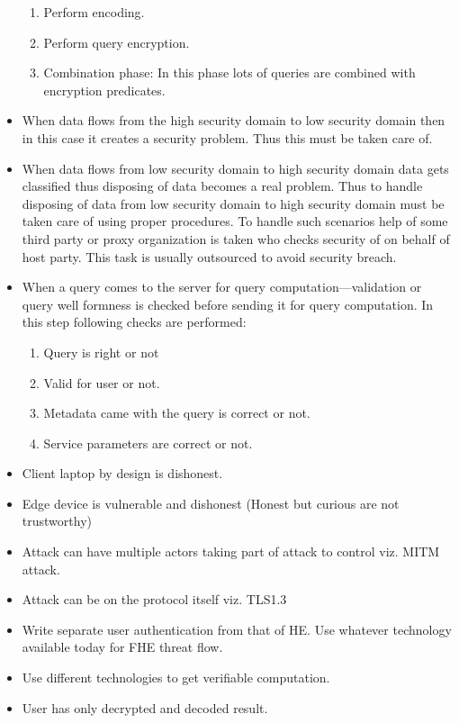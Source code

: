 \begin{itemize}
\begin{enumerate}
              \item Perform encoding.
              \item Perform query encryption.
              \item Combination phase: In this phase lots of queries are combined with encryption predicates.
          \end{enumerate}
    \item When data flows from the high security domain to low security domain then in this case it creates a security problem. Thus this must be taken care of.
    \item When data flows from low security domain to high security domain data gets classified thus disposing of data becomes a real problem. Thus to handle disposing of data from low security domain to high security domain must be taken care of using proper procedures.  To handle such scenarios help of some third party or proxy organization is taken who checks security of on behalf of host party. This task is usually outsourced to avoid security breach.
    \item When a query comes to the server for query computation---validation or query well formness is checked before sending it for query computation. In this step following checks are performed:
          \begin{enumerate}
              \item Query is right or not
              \item Valid for user or not.
              \item Metadata came with the query is correct or not.
              \item Service parameters are correct or not.
          \end{enumerate}
    \item Client laptop by design is dishonest.
    \item Edge device is vulnerable and dishonest (Honest but curious are not trustworthy)
    \item Attack can have multiple actors taking part of attack to control viz. MITM attack.
    \item Attack can be on the protocol itself viz. TLS1.3
    \item Write separate user authentication from that of HE. Use whatever technology available today for FHE threat flow.
    \item Use different technologies to get verifiable computation.
    \item User has only decrypted and decoded result.

\end{itemize}
